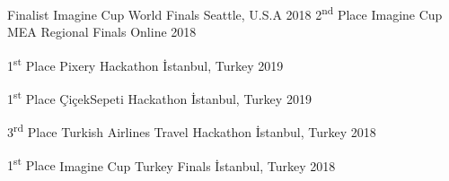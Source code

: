 
\vspace*{-1.5mm}

\vspace*{-1.5mm}

\begin{cvhonors}
  \cvhonor
    {Finalist}%
    {Imagine Cup World Finals}%
    {Seattle, U.S.A}%
    {2018}%
  \cvhonor
    {2\textsuperscript{nd} Place}
    {Imagine Cup MEA Regional Finals} %
    {Online}
    {2018}
\end{cvhonors}


\vspace*{-1.5mm}

\begin{cvhonors}
  \cvhonor
    {1\textsuperscript{st} Place}
    {Pixery Hackathon}
    {İstanbul, Turkey}
    {2019}

  \cvhonor
    {1\textsuperscript{st} Place}
    {ÇiçekSepeti Hackathon}
    {İstanbul, Turkey}
    {2019}

  \cvhonor
    {3\textsuperscript{rd} Place}
    {Turkish Airlines Travel Hackathon}
    {İstanbul, Turkey}
    {2018}

   \cvhonor
    {1\textsuperscript{st} Place}
    {Imagine Cup Turkey Finals}
    {İstanbul, Turkey}
    {2018}

\end{cvhonors}
